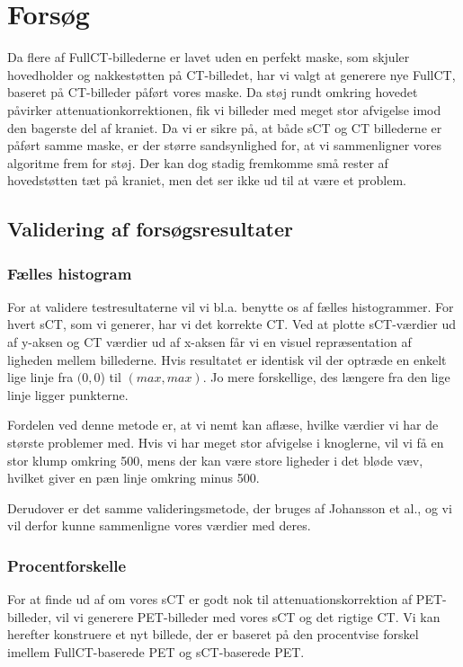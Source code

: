 \section{Forsøg}

Da flere af FullCT-billederne er lavet uden en perfekt maske, som skjuler hovedholder og nakkestøtten på CT-billedet, har vi valgt at generere nye FullCT, baseret på CT-billeder påført vores maske. Da støj rundt omkring hovedet påvirker attenuationkorrektionen, fik vi billeder med meget stor afvigelse imod den bagerste del af kraniet. Da vi er sikre på, at både sCT og CT billederne er påført samme maske, er der større sandsynlighed for, at vi sammenligner vores algoritme frem for støj. Der kan dog stadig fremkomme små rester af hovedstøtten tæt på kraniet, men det ser ikke ud til at være et problem.

\subsection{Validering af forsøgsresultater}

\subsubsection{Fælles histogram}

For at validere testresultaterne vil vi bl.a. benytte os af fælles histogrammer. For hvert sCT, som vi generer, har vi det korrekte CT. Ved at plotte sCT-værdier ud af y-aksen og CT værdier ud af x-aksen får vi en visuel repræsentation af ligheden mellem billederne. Hvis resultatet er identisk vil der optræde en enkelt lige linje fra $(0,0$) til $(max,max)$. Jo mere forskellige, des længere fra den lige linje ligger punkterne.

Fordelen ved denne metode er, at vi nemt kan aflæse, hvilke værdier vi har de største problemer med. Hvis vi har meget stor afvigelse i knoglerne, vil vi få en stor klump omkring 500, mens der kan være store ligheder i det bløde væv, hvilket giver en pæn linje omkring minus 500.

Derudover er det samme valideringsmetode, der bruges af Johansson et al., og vi vil derfor kunne sammenligne vores værdier med deres.

\subsubsection{Procentforskelle}

For at finde ud af om vores sCT er godt nok til attenuationskorrektion af PET-billeder, vil vi generere PET-billeder med vores sCT og det rigtige CT. Vi kan herefter konstruere et nyt billede, der er baseret på den procentvise forskel imellem FullCT-baserede PET og sCT-baserede PET. 

